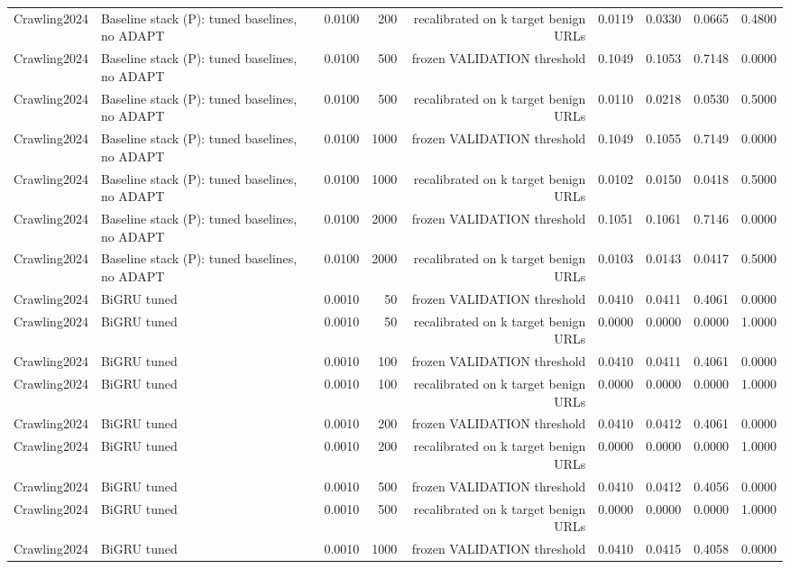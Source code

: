 \begin{table}[t]
\begin{tabular}{llrrrrrrr}
Crawling2024 & Baseline stack (P): tuned baselines, no ADAPT & 0.0100 & 200 & recalibrated on k target benign URLs & 0.0119 & 0.0330 & 0.0665 & 0.4800 \\
Crawling2024 & Baseline stack (P): tuned baselines, no ADAPT & 0.0100 & 500 & frozen VALIDATION threshold & 0.1049 & 0.1053 & 0.7148 & 0.0000 \\
Crawling2024 & Baseline stack (P): tuned baselines, no ADAPT & 0.0100 & 500 & recalibrated on k target benign URLs & 0.0110 & 0.0218 & 0.0530 & 0.5000 \\
Crawling2024 & Baseline stack (P): tuned baselines, no ADAPT & 0.0100 & 1000 & frozen VALIDATION threshold & 0.1049 & 0.1055 & 0.7149 & 0.0000 \\
Crawling2024 & Baseline stack (P): tuned baselines, no ADAPT & 0.0100 & 1000 & recalibrated on k target benign URLs & 0.0102 & 0.0150 & 0.0418 & 0.5000 \\
Crawling2024 & Baseline stack (P): tuned baselines, no ADAPT & 0.0100 & 2000 & frozen VALIDATION threshold & 0.1051 & 0.1061 & 0.7146 & 0.0000 \\
Crawling2024 & Baseline stack (P): tuned baselines, no ADAPT & 0.0100 & 2000 & recalibrated on k target benign URLs & 0.0103 & 0.0143 & 0.0417 & 0.5000 \\
Crawling2024 & BiGRU tuned & 0.0010 & 50 & frozen VALIDATION threshold & 0.0410 & 0.0411 & 0.4061 & 0.0000 \\
Crawling2024 & BiGRU tuned & 0.0010 & 50 & recalibrated on k target benign URLs & 0.0000 & 0.0000 & 0.0000 & 1.0000 \\
Crawling2024 & BiGRU tuned & 0.0010 & 100 & frozen VALIDATION threshold & 0.0410 & 0.0411 & 0.4061 & 0.0000 \\
Crawling2024 & BiGRU tuned & 0.0010 & 100 & recalibrated on k target benign URLs & 0.0000 & 0.0000 & 0.0000 & 1.0000 \\
Crawling2024 & BiGRU tuned & 0.0010 & 200 & frozen VALIDATION threshold & 0.0410 & 0.0412 & 0.4061 & 0.0000 \\
Crawling2024 & BiGRU tuned & 0.0010 & 200 & recalibrated on k target benign URLs & 0.0000 & 0.0000 & 0.0000 & 1.0000 \\
Crawling2024 & BiGRU tuned & 0.0010 & 500 & frozen VALIDATION threshold & 0.0410 & 0.0412 & 0.4056 & 0.0000 \\
Crawling2024 & BiGRU tuned & 0.0010 & 500 & recalibrated on k target benign URLs & 0.0000 & 0.0000 & 0.0000 & 1.0000 \\
Crawling2024 & BiGRU tuned & 0.0010 & 1000 & frozen VALIDATION threshold & 0.0410 & 0.0415 & 0.4058 & 0.0000 \\

\end{tabular}
\end{table}
